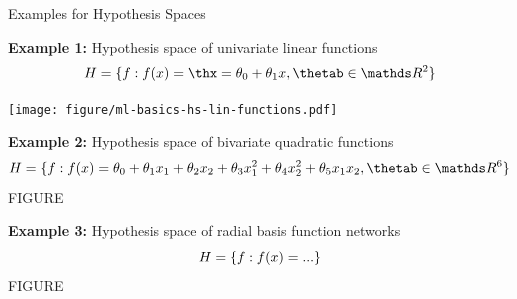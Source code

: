 \documentclass[11pt,compress,t,notes=noshow, xcolor=table]{beamer}
\begin{document}

\begin{vbframe}{Examples for Hypothesis Spaces}

\textbf{Example 1:} Hypothesis space of univariate linear functions
$$\Hspace = \{f: \fx = \thx =  \theta_0 + \theta_1 x, \thetab \in \R^2\}$$

\begin{center}
  \texttt{[image: figure/ml-basics-hs-lin-functions.pdf]}
\end{center}

\framebreak

\textbf{Example 2:} Hypothesis space of bivariate quadratic functions
$$\Hspace = \{f: \fx =  \theta_0 + \theta_1 x_1 + \theta_2 x_2 +
\theta_3 x_1^2 + \theta_4 x_2^2 + \theta_5 x_1 x_2, \thetab \in \R^6\}$$
\color{red} {FIGURE}
\color{black}

\framebreak

\textbf{Example 3:} Hypothesis space of radial basis function networks
$$H = \{f: f(x) =  ...\}$$
\color{red} {FIGURE}
  \color{black}

\end{vbframe}


\endlecture
\end{document}
